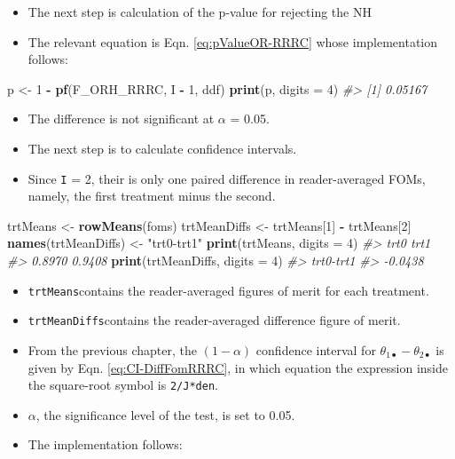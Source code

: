 \documentclass[
]{book}
\newenvironment{Shaded}{\begin{snugshade}}{\end{snugshade}}
\newcommand{\CommentTok}[1]{\textcolor[rgb]{0.56,0.35,0.01}{\textit{#1}}}
\newcommand{\DataTypeTok}[1]{\textcolor[rgb]{0.13,0.29,0.53}{#1}}
\newcommand{\DecValTok}[1]{\textcolor[rgb]{0.00,0.00,0.81}{#1}}
\newcommand{\KeywordTok}[1]{\textcolor[rgb]{0.13,0.29,0.53}{\textbf{#1}}}
\newcommand{\NormalTok}[1]{#1}
\newcommand{\OperatorTok}[1]{\textcolor[rgb]{0.81,0.36,0.00}{\textbf{#1}}}
\newcommand{\StringTok}[1]{\textcolor[rgb]{0.31,0.60,0.02}{#1}}
\providecommand{\tightlist}{%
  \setlength{\itemsep}{0pt}\setlength{\parskip}{0pt}}
\begin{document}
\begin{itemize}
\tightlist
\item
  The next step is calculation of the p-value for rejecting the NH
\item
  The relevant equation is Eqn. \eqref{eq:pValueOR-RRRC} whose implementation follows:
\end{itemize}

\begin{Shaded}
\begin{Highlighting}[]
\NormalTok{p <-}\StringTok{ }\DecValTok{1} \OperatorTok{-}\StringTok{ }\KeywordTok{pf}\NormalTok{(F_ORH_RRRC, I }\OperatorTok{-}\StringTok{ }\DecValTok{1}\NormalTok{, ddf)}
\KeywordTok{print}\NormalTok{(p, }\DataTypeTok{digits =} \DecValTok{4}\NormalTok{)}
\CommentTok{#> [1] 0.05167}
\end{Highlighting}
\end{Shaded}

\begin{itemize}
\tightlist
\item
  The difference is not significant at \(\alpha\) = 0.05.
\item
  The next step is to calculate confidence intervals.
\item
  Since \texttt{I} = 2, their is only one paired difference in reader-averaged FOMs, namely, the first treatment minus the second.
\end{itemize}

\begin{Shaded}
\begin{Highlighting}[]
\NormalTok{trtMeans <-}\StringTok{ }\KeywordTok{rowMeans}\NormalTok{(foms)}
\NormalTok{trtMeanDiffs <-}\StringTok{ }\NormalTok{trtMeans[}\DecValTok{1}\NormalTok{] }\OperatorTok{-}\StringTok{ }\NormalTok{trtMeans[}\DecValTok{2}\NormalTok{]}
\KeywordTok{names}\NormalTok{(trtMeanDiffs) <-}\StringTok{ "trt0-trt1"}
\KeywordTok{print}\NormalTok{(trtMeans, }\DataTypeTok{digits =} \DecValTok{4}\NormalTok{)}
\CommentTok{#>   trt0   trt1 }
\CommentTok{#> 0.8970 0.9408}
\KeywordTok{print}\NormalTok{(trtMeanDiffs, }\DataTypeTok{digits =} \DecValTok{4}\NormalTok{)}
\CommentTok{#> trt0-trt1 }
\CommentTok{#>   -0.0438}
\end{Highlighting}
\end{Shaded}

\begin{itemize}
\tightlist
\item
  \texttt{trtMeans}contains the reader-averaged figures of merit for each treatment.
\item
  \texttt{trtMeanDiffs}contains the reader-averaged difference figure of merit.
\item
  From the previous chapter, the \((1-\alpha)\) confidence interval for \(\theta_{1 \bullet} - \theta_{2 \bullet}\) is given by Eqn. \eqref{eq:CI-DiffFomRRRC}, in which equation the expression inside the square-root symbol is \texttt{2/J*den}.
\item
  \(\alpha\), the significance level of the test, is set to 0.05.
\item
  The implementation follows:
\end{itemize}
\end{document}
